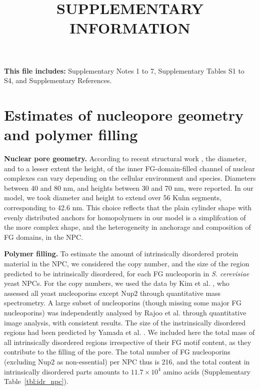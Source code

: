 \documentclass[10pt, a4paper, twocolumn]{article}
\title{SUPPLEMENTARY INFORMATION}
\author{}
\date{}
\begin{document}
\maketitle


\begin{center}
    \textbf{This file includes:} Supplementary Notes 1 to 7, Supplementary Tables S1 to S4, and Supplementary References.
\end{center}
\twocolumn


\pagebreak
\section{Estimates of nucleopore geometry and polymer filling}

\textbf{Nuclear pore geometry.}
According to recent structural work \cite{Zimmerli2021, Schuller2021}, the diameter, and to a lesser extent the height, of the inner FG-domain-filled channel of nuclear complexes can vary depending on the cellular environment and species.
Diameters between 40 and 80 nm, and heights between 30 and 70 nm, were reported.
In our model, we took diameter and height to extend over 56 Kuhn segments, corresponding to 42.6 nm.
This choice reflects that the plain cylinder shape with evenly distributed anchors for homopolymers in our model is a simplifcation of the more complex shape, and the heterogeneity in anchorage and composition of FG domains, in the NPC.

\bigskip\noindent
\textbf{Polymer filling.}
To estimate the amount of intrinsically disordered protein material in the NPC, we considered the copy number, and the size of the region predicted to be intrinsically disordered, for each FG nucleoporin in \textit{S. cerevisiae} yeast NPCs.
For the copy numbers, we used the data by Kim et al. \cite{Kim2018}, who assessed all yeast nucleoporins except Nup2 through quantitative mass spectrometry.
A large subset of nucleoporins (though missing some major FG nucleoporins) was independently analysed by Rajoo et al. \cite{Rajoo2018} through quantitative image analysis, with consistent results.
The size of the instrinsically disordered regions had been predicted by Yamada et al. \cite{Yamada2010}.
We included here the total mass of all intrinsically disordered regions irrespective of their FG motif content, as they contribute to the filling of the pore.
The total number of FG nucleoporins (excluding Nup2 as non-essential) per NPC thus is 216, and the total content in intrinsically disordered parts amounts to  $11.7 \times 10^4$ amino acids (Supplementary Table~\ref{tbl:idr_npc}).
\end{document}
